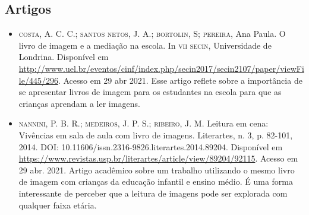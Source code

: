 \documentclass[11pt]{extarticle}
\begin{document}
\subsection{Artigos}

\begin{itemize}
\item \textsc{costa}, A. C. C.; \textsc{santos netos}, J. A.; \textsc{bortolin}, S; \textsc{pereira}, Ana Paula. O livro de imagem e a mediação na escola. 
In \textsc{vii secin}, Universidade de Londrina. Disponível em \url{http://www.uel.br/eventos/cinf/index.php/secin2017/secin2107/paper/viewFile/445/296}. 
Acesso em 29 abr 2021. 
Esse artigo reflete sobre a importância de se apresentar livros de imagem para os estudantes na escola para que as crianças aprendam a ler imagens. 

\item \textsc{nannini}, P. B. R.; \textsc{medeiros}, J. P. S.; \textsc{ribeiro}, J. M. Leitura em cena: Vivências em sala de aula com livro de imagens. 
Literartes, n. 3, p. 82-101, 2014. DOI: 10.11606/issn.2316-9826.literartes.2014.89204. 
Disponível em \url{https://www.revistas.usp.br/literartes/article/view/89204/92115}. Acesso em 29 abr. 2021. 
Artigo acadêmico sobre um trabalho utilizando o mesmo livro de imagem com crianças da educação infantil e ensino médio. 
É uma forma interessante de perceber que a leitura de imagens pode ser explorada com qualquer faixa etária. 
\end{itemize}

% 
\end{document}
